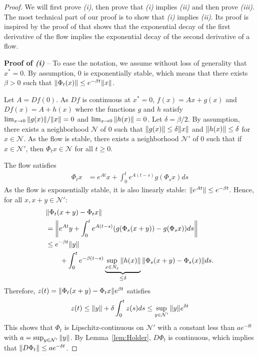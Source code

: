 \documentclass[sigconf]{acmart}
\newcommand\calN{\mathcal{N}}
\newcommand\norm[1]{{\mathchoice{\bnorm{#1}}{\snorm{#1}}{\snorm{#1}}{\snorm{#1}}}}
\newcommand\bnorm[1]{\left\|#1\right\|}
\newcommand\snorm[1]{\|#1\|}
\begin{document}
\begin{proof}
  We will first prove \emph{(i)}, then prove that \emph{(i)} implies
  \emph{(ii)} and then prove \emph{(iii)}.  The most technical part of
  our proof is to show that \emph{(i)} implies \emph{(ii)}. Its proof
  is inspired by the proof of \cite[Lemma~C.1]{eldering2013normally}
  that shows that the exponential decay of the first derivative of
  the flow implies the exponential decay of the second derivative of a
  flow.
  
  \textbf{Proof of \emph{(i)}} -- To ease the notation, we assume
  without loss of generality that $x^*=0$. By assumption, $0$ is
  exponentially stable, which means that there exists $\beta>0$ such
  that $\norm{\Phi_t(x)}\le e^{-\beta t}\norm{x}$.

  Let $A=Df(0)$.  As $Df$ is continuous at $x^*=0$, $f(x)=Ax + g(x)$
  and $Df(x)=A+h(x)$ where the functions $g$ and $h$ satisfy
  $\lim_{x\to0}\norm{g(x)}/\norm{x}=0$ and
  $\lim_{x\to0}\norm{h(x)}=0$. Let $\delta=\beta/2$. By assumption,
  there exists a neighborhood $\calN$ of $0$ such that
  $\norm{g(x)}\le\delta\norm{x}$ and $\norm{h(x)}\le\delta$ for
  $x\in\calN$. As the flow is stable, there exists a neighborhood
  $\calN'$ of $0$ such that if $x\in\calN'$, then $\Phi_tx\in \calN$
  for all $t\ge0$.
  
  The flow satisfies
  \begin{align*}
    \Phi_tx &= e^{At}x + \int_0^t e^{A(t-s)} g(\Phi_sx)ds
  \end{align*}
  As the flow is exponentially stable, it is also linearly stable:
  $\norm{e^{At}}\le e^{-\beta t}$. Hence, for all $x,x+y\in\calN'$:
  \begin{align*}
    & \norm{\Phi_t(x+y) - \Phi_tx}\\
    &= \norm{e^{At}y + \int_0^t e^{A(t-s)}
      (g(\Phi_s(x+y))-g(\Phi_sx))ds}\\
    &\le e^{-\beta t}\norm{y} \\
    &\qquad+ \int_0^t
      e^{-\beta(t-s)} \underbrace{\sup_{x\in 
      N_\varepsilon}\norm{h(x)}}_{\le\delta}\norm{\Phi_s(x+y)-\Phi_s(x)}ds. 
  \end{align*}
  Therefore, $z(t)=\norm{\Phi_t(x+y)-\Phi_tx}e^{\beta t}$ satisfies
  \begin{align*}
    z(t)\le \norm{y} + \delta \int_0^t z(s)ds \le
    \sup_{y\in\calN'}\norm{y}e^{\delta t}
  \end{align*}
  This shows that $\Phi_t$ is Lipschitz-continuous on $\calN'$ with a
  constant less than $ae^{-\delta t}$ with
  $a=\sup_{y\in\calN'}\norm{y}$. By Lemma~\ref{lem:Holder}, $D\Phi_t$
  is continuous, which implies that
  $\norm{D\Phi_t}\le ae^{-\delta t}$. 
  

\end{proof}
\end{document}
